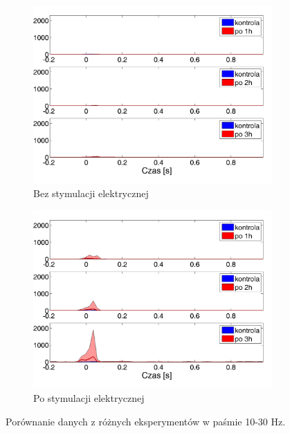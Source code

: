 \documentclass{pracamgr_2}
\begin{document}
\begin{figure}[h]
	\begin{subfigure}{.5\textwidth}
		\centering
		\includegraphics[width=1.\linewidth]{kontrola15_10-30_z_CxC8_do_SC4.png}
		\caption{Bez stymulacji elektrycznej}
		\label{rys:kon_CxC_SC}
	\end{subfigure}%
	\begin{subfigure}{.5\textwidth}
		\centering
		\includegraphics[width=1.\linewidth]{beta3_10-30_z_CxC5_do_SC4.png}
		\caption{Po stymulacji elektrycznej}
		\label{rys:beta_CxC_SC}
	\end{subfigure}
	\caption{Porównanie danych z różnych eksperymentów w paśmie 10-30 Hz.}
	\label{rys:10_30_CxC_SC}
\end{figure}
\end{document}
